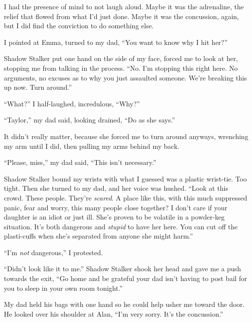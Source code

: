 I had the presence of mind to not laugh aloud.  Maybe it was the adrenaline, the relief that flowed from what I'd just done.  Maybe it was the concussion, again, but I did find the conviction to do something else.



I pointed at Emma, turned to my dad, ``You want to know why I hit her?''



Shadow Stalker put one hand on the side of my face, forced me to look at her, stopping me from talking in the process. ``No.  I'm stopping this right here.  No arguments, no excuses as to why you just assaulted someone.  We're breaking this up now.  Turn around.''



``What?'' I half-laughed, incredulous, ``Why?''



``Taylor,'' my dad said, looking drained, ``Do as she says.''



It didn't really matter, because she forced me to turn around anyways, wrenching my arm until I did, then pulling my arms behind my back.



``Please, miss,'' my dad said, ``This isn't necessary.''



Shadow Stalker bound my wrists with what I guessed was a plastic wrist-tie.  Too tight.  Then she turned to my dad, and her voice was hushed.  ``Look at this crowd.  These people.  They're \emph{scared}.  A place like this, with this much suppressed panic, fear and worry, this many people close together?  I don't care if your daughter is an idiot or just ill.  She's proven to be volatile in a powder-keg situation.  It's both dangerous and \emph{stupid} to have her here.  You can cut off the plasti-cuffs when she's separated from anyone she might harm.''



``I'm \emph{not} dangerous,'' I protested.



``Didn't look like it to me.'' Shadow Stalker shook her head and gave me a push towards the exit, ``Go home and be grateful your dad isn't having to post bail for you to sleep in your own room tonight.''



My dad held his bags with one hand so he could help usher me toward the door.  He looked over his shoulder at Alan, ``I'm very sorry.  It's the concussion.''



